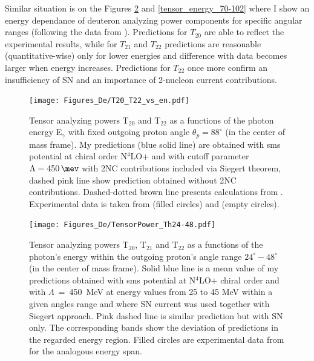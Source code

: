     Similar situation is on the Figures \ref{tensor_energy_24-48} and \ref{tensor_energy_70-102}
    where I show an energy dependance of deuteron analyzing power components for 
    specific angular ranges (following the data from \cite{rachek2007}).
    Predictions for $T_{20}$ are able to reflect the experimental results,
    while for $T_{21}$ and $T_{22}$ predictions are reasonable (quantitative-wise) 
    only for lower energies and difference with data becomes larger
    when energy increases. Predictions for $T_{22}$ once more 
    confirm an insufficiency of SN and an importance of
    2-nucleon current contributions. 
    

    \begin{figure}[h]
        \begin{center}
        \texttt{[image: Figures\_De/T20\_T22\_vs\_en.pdf]}
        \end{center}
        \caption{Tensor analyzing powers T$_{20}$ and T$_{22}$ as a functions of the photon energy E$_\gamma$
        with fixed outgoing proton angle $\theta_p = 88^{\circ}$ (in the center of mass frame).
        My predictions (blue solid line) are obtained with \gls*{sms} potential at chiral order N$^4$LO+
        and with cutoff parameter $\Lambda = \SI{450}{\mev}$ with 2NC contributions included via Siegert theorem,
        dashed pink line show prediction obtained without 2NC contributions.
        Dashed-dotted brown line presents calculations from \cite{Schmitt1989}.
        Experimental data is taken from \cite{rachek2007} (filled circles)
        and \cite{mishev1993} (empty circles).}
        \label{T20_vs_en}
    \end{figure}

    \begin{figure}[h]
        \begin{center}
        \texttt{[image: Figures\_De/TensorPower\_Th24-48.pdf]}
        \end{center}
        \caption{Tensor analyzing powers T$_{20}$, T$_{21}$ and T$_{22}$ as a functions of the
        photon's energy within the outgoing proton's angle range $24^{\circ} - 48^{\circ}$
        (in the center of mass frame).
        Solid blue line is a mean value of my predictions obtained with
        \gls*{sms} potential at N$^4$LO+ chiral order and with $\Lambda$~=~450~MeV
        at energy values from 25 to 45 MeV within
        a given angles range and
        where SN current was used together with Siegert approach. 
        Pink dashed line is similar prediction but with SN only. 
        The corresponding bands show the deviation of predictions in the regarded
        energy region.
        Filled circles are experimental data
        from \cite{rachek2007} for the analogous energy span.}
        \label{tensor_energy_24-48}
    \end{figure}

